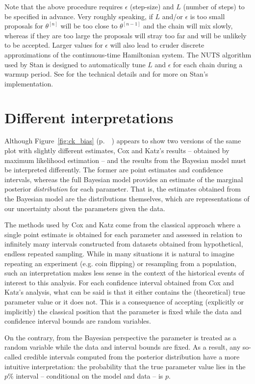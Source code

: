 Note that the above procedure requires $\epsilon$ (step-size) and $L$ (number of steps) to be specified in 
advance. Very roughly speaking, if $L$ and/or $\epsilon$ is too small proposals for $\theta^{[n]}$ will be too 
close to $\theta^{[n-1]}$ and the chain will mix slowly, whereas if they are too large the proposals will stray 
too far and will be unlikely to be accepted. Larger values for $\epsilon$ will also lead to cruder discrete
approximations of the continuous-time Hamiltonian system. The NUTS algorithm  
used by Stan is designed to automatically tune $L$ and $\epsilon$ for each chain during a warmup period. 
See  for the technical details and  for more 
on Stan's implementation. 




\clearpage
\chapter[Different Interpretations]{Different interpretations}\label{AppendixE}

Although Figure~\ref{fig:ck_bias} (p.~~\pageref{fig:ck_bias}) appears to show two versions of the same plot with
slightly different estimates, Cox and Katz's results -- obtained by maximum likelihood estimation --
and the results from the Bayesian model must be interpreted differently. The former are point estimates 
and confidence intervals, whereas the full Bayesian model provides an estimate of the marginal posterior 
{\it distribution} for each parameter. That is, the estimates obtained from the Bayesian model are the 
distributions themselves, which are representations of our uncertainty about the parameters 
given the data. 

The methods used by Cox and Katz come from the classical approach where a single point 
estimate is obtained for each parameter and assessed in relation to infinitely many intervals 
constructed from datasets obtained from hypothetical, endless repeated sampling. While in many 
situations it is natural to imagine repeating an experiment (e.g. coin flipping) or resampling from 
a population, such an interpretation makes less sense in the context of the historical 
events of interest to this analysis. For each confidence interval obtained from Cox and Katz's analysis, 
what can be said is that it either contains the (theoretical) true parameter value or it does not. This is 
a consequence of accepting (explicitly or implicitly) the classical position that the parameter is fixed 
while the data and confidence interval bounds are random variables. 

On the contrary, from the Bayesian perspective the parameter is treated as a random variable while 
the data and interval bounds are fixed. As a result, any so-called credible intervals computed from the 
posterior distribution have a more intuitive interpretation: the probability that the true parameter value lies 
in the $p\%$ interval  -- conditional on the model and data -- is $p$. 



